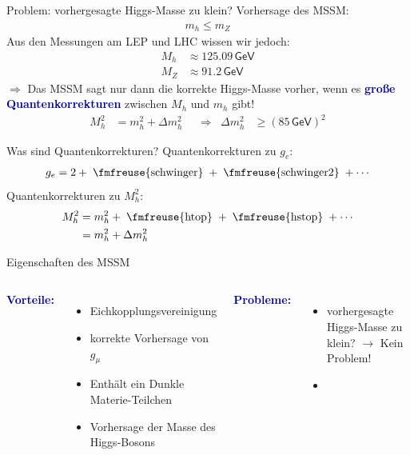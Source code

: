 \documentclass[hyperref={pdfpagelabels=false},ngerman]{beamer}
\newcommand{\fmfvcenter}[1]{\;\vcenter{\hbox{\fmfreuse{#1}}}\;}
\newcommand{\eh}[1]{\,\mathsf{#1}}
\renewcommand{\emph}[1]{\textbf{\textcolor{darkblue}{#1}}}
\newcommand{\GeV}{\eh{GeV}}
\begin{document}
\begin{frame}{Problem: vorhergesagte Higgs-Masse zu klein?}
  Vorhersage des MSSM:
  \begin{align*}
    m_h \le m_Z
  \end{align*}
  Aus den Messungen am LEP und LHC wissen wir jedoch:
  \begin{align*}
    M_h &\approx 125.09 \GeV \\
    M_Z &\approx 91.2 \GeV
  \end{align*}
  $\Rightarrow$ Das MSSM sagt nur dann die korrekte Higgs-Masse
  vorher, wenn es \emph{große Quantenkorrekturen} zwischen $M_h$
  und $m_h$ gibt!
  \begin{align*}
    M_h^2 &= m_h^2 + \Delta m_h^2
    & &\Rightarrow &
    \Delta m_h^2 &\geq (85\eh{GeV})^2
  \end{align*}
\end{frame}

\begin{frame}{Was sind Quantenkorrekturen?}
  Quantenkorrekturen zu $g_e$:
  \begin{align*}
    g_e = 2 + \fmfvcenter{schwinger} + \fmfvcenter{schwinger2} + \cdots
  \end{align*}
  Quantenkorrekturen zu $M_h^2$:
  \begin{align*}
    M_h^2 &= m_h^2 + \fmfvcenter{htop} + \fmfvcenter{hstop} + \cdots \\
          &= m_h^2 + \Delta m_h^2
  \end{align*}
\end{frame}

\begin{frame}{Eigenschaften des MSSM}
  \begin{columns}
    \emph{Vorteile:}
    \begin{itemize}
    \item Eichkopplungsvereinigung
    \item korrekte Vorhersage von $g_\mu$
    \item Enthält ein Dunkle Materie-Teilchen
    \item Vorhersage der Masse des Higgs-Bosons
    \end{itemize}
    \emph{Probleme:}
    \begin{itemize}
    \item vorhergesagte Higgs-Masse zu klein?
      $\rightarrow$ Kein Problem!
    \item {}
    \end{itemize}
  \end{columns}
\end{frame}
\end{document}
